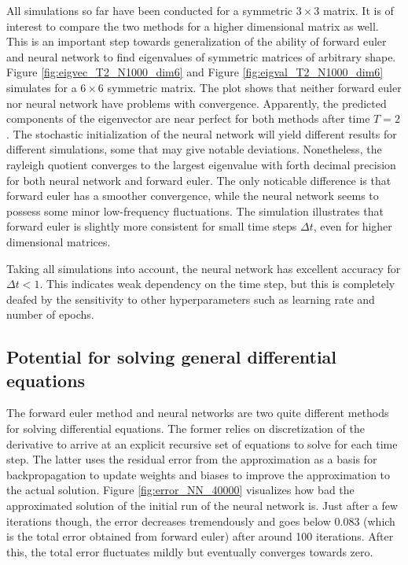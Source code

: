 \documentclass[12pt]{extarticle}
\begin{document}
All simulations so far have been conducted for a symmetric $3\times 3$ matrix. It is of interest to compare the two methods for a higher dimensional matrix as well. This is an important step towards generalization of the ability of forward euler and neural network to find eigenvalues of symmetric matrices of arbitrary shape. Figure \ref{fig:eigvec_T2_N1000_dim6} and Figure \ref{fig:eigval_T2_N1000_dim6} simulates for a $6\times 6$ symmetric matrix. The plot shows that neither forward euler nor neural network have problems with convergence. Apparently, the predicted components of the eigenvector are near perfect for both methods after time $T=2$. The stochastic initialization of the neural network will yield different results for different simulations, some that may give notable deviations. Nonetheless, the rayleigh quotient converges to the largest eigenvalue with forth decimal precision for both neural network and forward euler. The only noticable difference is that forward euler has a smoother convergence, while the neural network seems to possess some minor low-frequency fluctuations. The simulation illustrates that forward euler is slightly more consistent for small time steps $\Delta t$, even for higher dimensional matrices.

Taking all simulations into account, the neural network has excellent accuracy for $\Delta t < 1$. This indicates weak dependency on the time step, but this is completely deafed by the sensitivity to other hyperparameters such as learning rate and number of epochs.



\subsection{Potential for solving general differential equations}
The forward euler method and neural networks are two quite different methods for solving differential equations. The former relies on discretization of the derivative to arrive at an explicit recursive set of equations to solve for each time step. The latter uses the residual error from the approximation as a basis for backpropagation to update weights and biases to improve the approximation to the actual solution. Figure \ref{fig:error_NN_40000} visualizes how bad the approximated solution of the initial run of the neural network is. Just after a few iterations though, the error decreases tremendously and goes below 0.083 (which is the total error obtained from forward euler) after around 100 iterations. After this, the total error fluctuates mildly but eventually converges towards zero.
 
\end{document}
